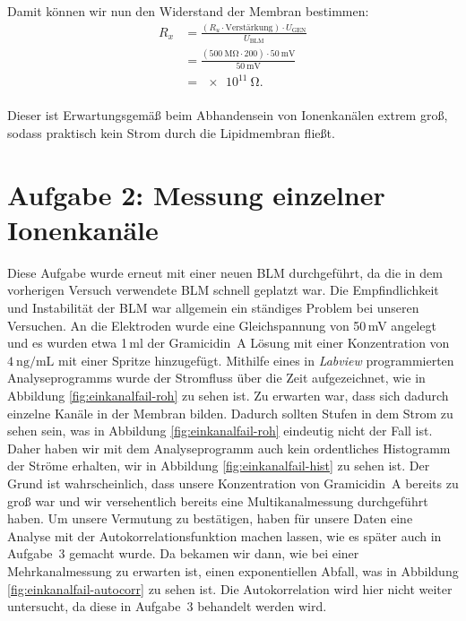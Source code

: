 \documentclass[a4paper,ngerman]{scrartcl}
\begin{document}
Damit können wir nun den Widerstand der Membran bestimmen:
\begin{equation}
  \begin{split}
    R_x &= \frac{\left(R_u \cdot \text{Verstärkung}\right) \cdot U_{\mathrm{GEN}}}{U_{\mathrm{BLM}}}\\
        &= \frac{\left(\SI{500}{\mega\ohm}\cdot 200\right) \cdot \SI{50}{\milli\volt}}{\SI{50}{\milli\volt}}\\
        &= \SI{e11}{\ohm}.\\
  \end{split}
\end{equation}

Dieser ist Erwartungsgemäß beim Abhandensein von Ionenkanälen extrem
groß, sodass praktisch kein Strom durch die Lipidmembran fließt.

\clearpage
\section{Aufgabe 2: Messung einzelner Ionenkanäle}
Diese Aufgabe wurde erneut mit einer neuen BLM durchgeführt, da die in dem vorherigen Versuch verwendete BLM schnell geplatzt war.
Die Empfindlichkeit und Instabilität der BLM war allgemein ein ständiges Problem bei unseren Versuchen.
An die Elektroden wurde eine Gleichspannung von 50\,mV angelegt und es wurden etwa 1\,ml der Gramicidin~A Lösung mit einer Konzentration von $\SI{4}{\nano\gram\per\milli\liter}$ mit einer Spritze hinzugefügt. Mithilfe eines in \emph{Labview} programmierten Analyseprogramms wurde 
der Stromfluss über die Zeit aufgezeichnet, wie in Abbildung \ref{fig:einkanalfail-roh} zu sehen ist.
Zu erwarten war, dass sich dadurch einzelne Kanäle in der Membran bilden. 
Dadurch sollten Stufen in dem Strom zu sehen sein, was in Abbildung \ref{fig:einkanalfail-roh} eindeutig nicht der Fall ist. 
Daher haben wir mit dem Analyseprogramm auch kein ordentliches Histogramm der Ströme erhalten, wir in Abbildung \ref{fig:einkanalfail-hist} zu sehen ist. 
Der Grund ist wahrscheinlich, dass unsere Konzentration von Gramicidin~A bereits zu groß war und wir versehentlich bereits eine Multikanalmessung durchgeführt haben. Um unsere Vermutung zu bestätigen, haben für unsere Daten eine Analyse mit der Autokorrelationsfunktion machen lassen,
wie es später auch in Aufgabe~3 gemacht wurde. 
Da bekamen wir dann, wie bei einer Mehrkanalmessung zu erwarten ist, einen exponentiellen Abfall, 
was in Abbildung \ref{fig:einkanalfail-autocorr} zu sehen ist. 
Die Autokorrelation wird hier nicht weiter untersucht, da diese in Aufgabe~3 behandelt werden wird.\\
\end{document}
